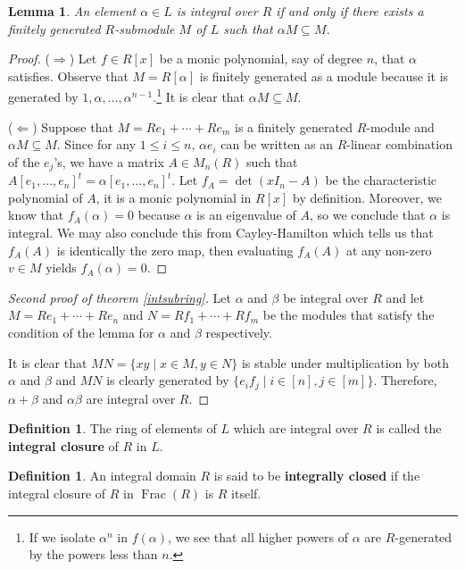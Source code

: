 \documentclass{tufte-handout} %
\newtheorem{cor}[thm]{Corollary}
\newtheorem{lem}[thm]{Lemma}
\theoremstyle{definition}
\newtheorem{defn}[thm]{Definition}
\theoremstyle{remark}
\DeclareMathOperator{\ff}{Frac}
\begin{document}
\begin{lem}\label{lemintchar}
	An element $\alpha \in L$ is integral over $R$ if and only if there exists a finitely generated $R$-submodule $M$ of $L$ such that $\alpha M \subseteq M$.
\end{lem}
\begin{proof}
	($\Rightarrow$) Let $f \in R[x]$ be a monic polynomial, say of degree $n$, that $\alpha$ satisfies. Observe that $M = R[\alpha]$ is finitely generated as a module because it is generated by $1, \alpha, \dots, \alpha^{n-1}$.\footnote{If we isolate $\alpha^n$ in $f(\alpha)$, we see that all higher powers of $\alpha$ are $R$-generated by the powers less than $n$.} It is clear that $\alpha M \subseteq M$.
	
	($\Leftarrow$) Suppose that $M = Re_1 + \cdots + Re_m$ is a finitely generated $R$-module and $\alpha M \subseteq M$. Since for any $1 \leq i \leq n$, $\alpha e_i$ can be written as an $R$-linear combination of the $e_j$'s, we have a matrix $A \in M_n(R)$ such that $A[e_1, \dots, e_n]^t= \alpha[e_1, \dots, e_n]^t$. Let $f_A= \det(xI_n-A)$ be the characteristic polynomial of $A$, it is a monic polynomial in $R[x]$ by definition. Moreover, we know that $f_A(\alpha) = 0$ because $\alpha$ is an eigenvalue of $A$, so we conclude that $\alpha$ is integral. We may also conclude this from Cayley-Hamilton which tells us that $f_A(A)$ is identically the zero map, then evaluating $f_A(A)$ at any non-zero $v \in M$ yields $f_A(\alpha) = 0$.
\end{proof}
\begin{proof}[Second proof of theorem \ref{intsubring}]
	Let $\alpha$ and $\beta$ be integral over $R$ and let $M = Re_1 + \cdots + Re_n$ and $N = Rf_1 + \cdots + Rf_m$ be the modules that satisfy the condition of the lemma for $\alpha$ and $\beta$ respectively.
	
	It is clear that $MN = \{xy \mid x \in M, y \in N\}$ is stable under multiplication by both $\alpha$ and $\beta$ and $MN$ is clearly generated by $\{e_if_j \mid i \in [n], j \in [m]\}$. Therefore, $\alpha+\beta$ and $\alpha\beta$ are integral over $R$.
\end{proof}

\begin{defn}
    The ring of elements of $L$ which are integral over $R$ is called the \textbf{integral closure} of $R$ in $L$.
\end{defn}
\begin{defn}
	An integral domain $R$ is said to be \textbf{integrally closed} if the integral closure of $R$ in $\ff(R)$ is $R$ itself.
\end{defn}
\end{document}
